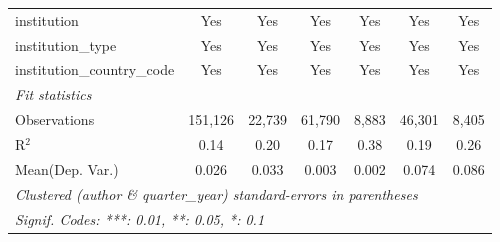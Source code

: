 \begin{tabular}{lcccccc}
   institution                  & Yes           & Yes           & Yes          & Yes      & Yes           & Yes\\  
   institution\_type            & Yes           & Yes           & Yes          & Yes      & Yes           & Yes\\  
   institution\_country\_code   & Yes           & Yes           & Yes          & Yes      & Yes           & Yes\\  
   \midrule
   \emph{Fit statistics}\\
   Observations                 & 151,126       & 22,739        & 61,790       & 8,883    & 46,301        & 8,405\\  
   R$^2$                        & 0.14          & 0.20          & 0.17         & 0.38     & 0.19          & 0.26\\  
Mean(Dep. Var.) & 0.026 & 0.033 & 0.003 & 0.002 & 0.074 & 0.086 \\
   \midrule \midrule
   \multicolumn{7}{l}{\emph{Clustered (author \& quarter\_year) standard-errors in parentheses}}\\
   \multicolumn{7}{l}{\emph{Signif. Codes: ***: 0.01, **: 0.05, *: 0.1}}\\
\end{tabular}
\par\endgroup

